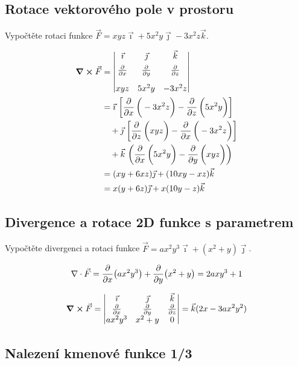 \konec

\subsection{Rotace vektorového pole v prostoru}

Vypočtěte rotaci funkce $\vec F=xyz\vec \imath + 5x^2y\vec\jmath-3x^2z\vec k$.

\reseni

 $$
 \begin{aligned}
\curl \vec F&=
 \begin{vmatrix}
   \vec\imath & \vec \jmath & \vec k\\[4pt]
   \pdv{x} & \pdv{y} & \pdv{z} \\[10pt]
   xyz& 5x^2y & -3x^2z
 \end{vmatrix}\\
 &=
\vec \imath \ \qty[\pd[x]{-3x^2z}-\pd[z]{5x^2y}]
\\&\quad +\vec \jmath \ \qty[\pd[z]{xyz}-\pd[x]{-3x^2z}] 
\\&\quad +\vec k\ \qty({\pd[x]{5x^2y}-\pd[y]{xyz}})\\
 &=(xy+6xz)\vec\jmath + (10xy-xz)\vec k
\\&=x(y+6z)\vec\jmath + x(10y-z)\vec k
\end{aligned}
 $$



\konec

\subsection{Divergence a rotace 2D funkce s parametrem}
Vypočtěte divergenci a rotaci funkce $\vec F=ax^2y^3\vec \imath + (x^2+y)\vec\jmath$.

\reseni

$$\nabla\cdot \vec F=\pdv{x}(ax^2y^3)+\pdv{y}(x^2+y)=2axy^3+1$$

 $$\curl \vec F=
 \begin{vmatrix}
   \vec\imath & \vec \jmath & \vec k\\
   \pdv{x} & \pdv{y} & \pdv{z} \\
   ax^2y^3 & x^2+y & 0
 \end{vmatrix}
 =\vec k(2x-3ax^2y^2)
 $$

\konec


\subsection{Nalezení kmenové funkce 1/3}

